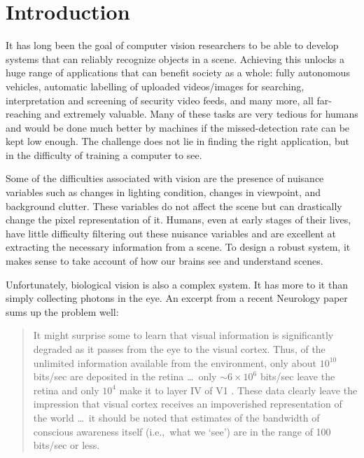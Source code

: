 \chapter{Introduction}\label{ch:intro}

\def \path {other}
\def \imgpath {\path/images}

It has long been the goal of computer vision researchers to be able to develop
systems that can reliably recognize objects in a scene. Achieving this unlocks a huge
range of applications that can benefit society as a whole: fully
autonomous vehicles, automatic labelling of uploaded videos/images for
searching, interpretation and screening of security video feeds, and many more,
all far-reaching and extremely valuable. Many of these tasks are very tedious for humans
and would be done much better by machines if the missed-detection rate can be
kept low enough. The challenge does not lie in finding the
right application, but in the difficulty of training a computer to see.

Some of the difficulties associated with vision are the presence of nuisance
variables such as changes in lighting condition, changes in viewpoint, and
background clutter. These variables do not affect the scene but can drastically change the pixel
representation of it.
Humans, even at early stages of their lives, have little difficulty filtering
out these nuisance variables and are excellent at extracting the necessary information from a scene.
To design a robust system, it makes sense to take account of how our brains see
and understand scenes.

Unfortunately, biological vision is also a complex system. It has
more to it than simply collecting photons in the eye.
An excerpt from a recent Neurology paper \cite{raichle_two_2010} sums up the problem
well:

\begin{quotation}
It might surprise some to learn that visual information is significantly
degraded as it passes from the eye to the visual cortex. Thus, of the unlimited
information available from the environment, only about $10^{10}$ bits/sec are
deposited in the retina \ldots\ only $\sim 6\times 10^6$
bits/sec leave the retina and only $10^4$ make it to layer IV of V1
\cite{anderson_directed_2005,tor_norretranders_user_1998}. These data
clearly leave the impression that visual cortex receives an impoverished
representation of the world \ldots\ it should be noted that estimates of the
bandwidth of conscious awareness itself (i.e.,\ what we `see') are in the range
of 100 bits/sec or less\cite{anderson_directed_2005,
tor_norretranders_user_1998}.
\end{quotation}


